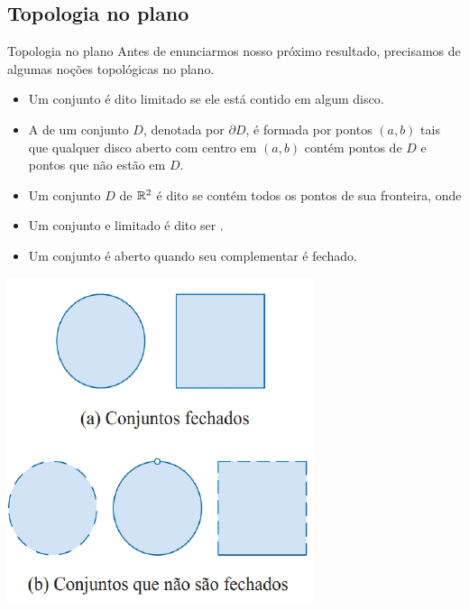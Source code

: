 \subsection*{Topologia no plano}
\begin{frame}[label=otimizacao]{Topologia no plano}
Antes de enunciarmos nosso próximo resultado, precisamos de algumas noções topológicas no plano.


\begin{minipage}{0.7\textwidth}
\begin{itemize}
\item Um conjunto é dito {\color{orange}limitado} se ele está contido em algum disco.

\item A  de um conjunto $D$, denotada por $\partial D$, é formada por pontos $(a,b)$ tais que qualquer disco aberto com centro em $(a,b)$ contém pontos de $D$ e pontos que não estão em $D$.


\item Um conjunto $D$ de $\mathbb{R}^2$ é dito  se contém todos os pontos de sua fronteira, onde 

\item Um conjunto  e {\color{orange}limitado} é dito ser .

\item Um conjunto  é {\color{red} aberto} quando seu complementar é fechado.


\end{itemize}

\end{minipage}
\begin{minipage}{0.2\textwidth}
\includegraphics[scale=.4]{figuras/fechados.png}
\end{minipage}



\end{frame}


